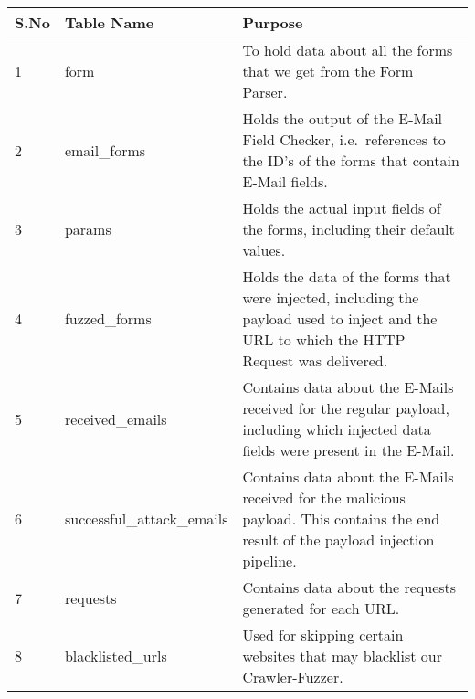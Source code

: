\begin{tabular}{|p{1cm}|p{5cm}|p{8cm}|}
	\hline
	S.No & Table Name & Purpose\\
	\hline
	1 & form & To hold data about all the forms that we get from the Form Parser.\\
	\hline
	2 & {{email\_forms}} & Holds the output of the E-Mail Field Checker, i.e.\ references to the ID's of the forms that contain E-Mail fields. \\
	\hline
	3 & params & Holds the actual input fields of the forms, including their default values.\\
	\hline
	4 & {{fuzzed\_forms}} & Holds the data of the forms that were injected, including the payload used to inject and the URL to which the HTTP Request was delivered.\\
	\hline
	5 & {{received\_emails}} & Contains data about the E-Mails received for the regular payload, including which injected data fields were present in the E-Mail.\\
	\hline
	6 & {{successful\_attack\_emails}} & Contains data about the E-Mails received for the malicious payload. This contains the end result of the payload injection pipeline.\\
	\hline
	7 & requests & Contains data about the requests generated for each URL.\\
	\hline
	8 & {{blacklisted\_urls}} & Used for skipping certain websites that may blacklist our Crawler-Fuzzer.\\
	\hline
\end{tabular}